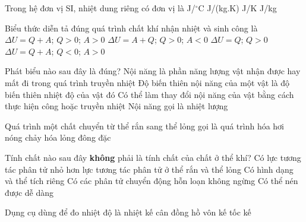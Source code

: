 	\begin{ex}%
		Trong hệ đơn vị SI, nhiệt dung riêng có đơn vị là
		\choice
		{J/$^\circ$C}
		{\True J/(kg.K)}
		{J/K}
		{J/kg}
	\end{ex}

	\begin{ex}%
		Biểu thức diễn tả đúng quá trình chất khí nhận nhiệt và sinh công là
		\choice
		{$\Delta U=Q+A$; $Q>0$; $A>0$}
		{\True $\Delta U=A+Q$; $Q>0$; $A<0$}
		{$\Delta U=Q$; $Q>0$}
		{$\Delta U=Q+A$; $Q<0$; $A>0$}
	\end{ex}

	\begin{ex}%
		Phát biểu nào sau đây là đúng?
		\choice
		{Nội năng là phần năng lượng vật nhận được hay mất đi trong quá trình truyền nhiệt}
		{Độ biến thiên nội năng của một vật là độ biến thiên nhiệt độ của vật đó}
		{\True Có thể làm thay đổi nội năng của vật bằng cách thực hiện công hoặc truyền nhiệt}
		{Nội năng gọi là nhiệt lượng}
	\end{ex}

	\begin{ex}%
		Quá trình một chất chuyển từ thể rắn sang thể lỏng gọi là quá trình
		\choice
		{hóa hơi}
		{\True nóng chảy}
		{hóa lỏng}
		{đông đặc}
	\end{ex}

	\begin{ex}%
		Tính chất nào sau đây \textbf{không} phải là tính chất của chất ở thể khí?
		\choice
		{Có lực tương tác phân tử nhỏ hơn lực tương tác phân tử ở thể rắn và thể lỏng}
		{\True Có hình dạng và thể tích riêng}
		{Có các phân tử chuyển động hỗn loạn không ngừng}
		{Có thể nén được dễ dàng}
	\end{ex}

	\begin{ex}%
		Dụng cụ dùng để đo nhiệt độ là
		\choice
		{\True nhiệt kế}
		{cân đồng hồ}
		{vôn kế}
		{tốc kế}
	\end{ex}

